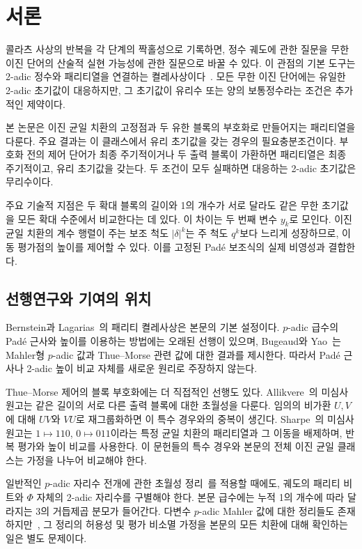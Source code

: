\documentclass[11pt,a4paper]{article}
\theoremstyle{koreanplain}
\begin{document}
\section{서론}

콜라츠 사상의 반복을 각 단계의 짝홀성으로 기록하면, 정수 궤도에 관한 질문을 무한 이진 단어의 산술적 실현 가능성에 관한 질문으로 바꿀 수 있다. 이 관점의 기본 도구는 2-adic 정수와 패리티열을 연결하는 켤레사상이다~\cite{BL1996}. 모든 무한 이진 단어에는 유일한 2-adic 초기값이 대응하지만, 그 초기값이 유리수 또는 양의 보통정수라는 조건은 추가적인 제약이다.

본 논문은 이진 균일 치환의 고정점과 두 유한 블록의 부호화로 만들어지는 패리티열을 다룬다. 주요 결과는 이 클래스에서 유리 초기값을 갖는 경우의 필요충분조건이다. 부호화 전의 제어 단어가 최종 주기적이거나 두 출력 블록이 가환하면 패리티열은 최종 주기적이고, 유리 초기값을 갖는다. 두 조건이 모두 실패하면 대응하는 2-adic 초기값은 무리수이다.

주요 기술적 지점은 두 확대 블록의 길이와 1의 개수가 서로 달라도 같은 무한 초기값을 모든 확대 수준에서 비교한다는 데 있다. 이 차이는 두 번째 변수 $y_k$로 모인다. 이진 균일 치환의 계수 행렬이 주는 보조 척도 $|\delta|^k$는 주 척도 $q^k$보다 느리게 성장하므로, 이동 평가점의 높이를 제어할 수 있다. 이를 고정된 Padé 보조식의 실제 비영성과 결합한다.

\subsection{선행연구와 기여의 위치}

Bernstein과 Lagarias~\cite{BL1996}의 패리티 켤레사상은 본문의 기본 설정이다. $p$-adic 급수의 Padé 근사와 높이를 이용하는 방법에는 오래된 선행이 있으며, Bugeaud와 Yao~\cite{BY2017}는 Mahler형 $p$-adic 값과 Thue--Morse 관련 값에 대한 결과를 제시한다. 따라서 Padé 근사나 2-adic 높이 비교 자체를 새로운 원리로 주장하지 않는다.

Thue--Morse 제어의 블록 부호화에는 더 직접적인 선행도 있다. Allikvere~\cite{Allikvere2026}의 미심사 원고는 같은 길이의 서로 다른 출력 블록에 대한 초월성을 다룬다. 임의의 비가환 $U,V$에 대해 $UV$와 $VU$로 재그룹화하면 이 특수 경우와의 중복이 생긴다. Sharpe~\cite{Sharpe2026}의 미심사 원고는 $1\mapsto110$, $0\mapsto011$이라는 특정 균일 치환의 패리티열과 그 이동을 배제하며, 반복 평가와 높이 비교를 사용한다. 이 문헌들의 특수 경우와 본문의 전체 이진 균일 클래스는 가정을 나누어 비교해야 한다.

일반적인 $p$-adic 자리수 전개에 관한 초월성 정리~\cite{AB2007}를 적용할 때에도, 궤도의 패리티 비트와 $\Phi$ 자체의 2-adic 자리수를 구별해야 한다. 본문 급수에는 누적 1의 개수에 따라 달라지는 3의 거듭제곱 분모가 들어간다. 다변수 $p$-adic Mahler 값에 대한 정리들도 존재하지만~\cite{Ide2019}, 그 정리의 허용성 및 평가 비소멸 가정을 본문의 모든 치환에 대해 확인하는 일은 별도 문제이다.
\end{document}
